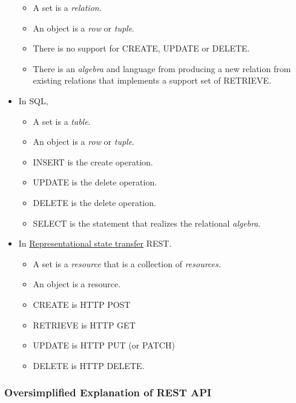 \documentclass[11pt]{article}
\providecommand{\tightlist}{%
      \setlength{\itemsep}{0pt}\setlength{\parskip}{0pt}}
\begin{document}
\begin{itemize}
  \begin{itemize}
  \tightlist
  \item
    A set is a \emph{relation}.
  \item
    An object is a \emph{row} or \emph{tuple}.
  \item
    There is no support for CREATE, UPDATE or DELETE.
  \item
    There is an \emph{algebra} and language from producing a new
    relation from existing relations that implements a support set of
    RETRIEVE.
  \end{itemize}
\item
  In SQL,

  \begin{itemize}
  \tightlist
  \item
    A set is a \emph{table}.
  \item
    An object is a \emph{row} or \emph{tuple}.
  \item
    INSERT is the create operation.
  \item
    UPDATE is the delete operation.
  \item
    DELETE is the delete operation.
  \item
    SELECT is the statement that realizes the relational \emph{algebra}.
  \end{itemize}
\item
  In
  \href{https://en.wikipedia.org/wiki/Representational_state_transfer}{Representational
  state transfer} REST.

  \begin{itemize}
  \tightlist
  \item
    A set is a \emph{resource} that is a collection of \emph{resources.}
  \item
    An object is a resource.
  \item
    CREATE is HTTP POST
  \item
    RETRIEVE is HTTP GET
  \item
    UPDATE is HTTP PUT (or PATCH)
  \item
    DELETE is HTTP DELETE.
  \end{itemize}
\end{itemize}

    \subsubsection{Oversimplified Explanation of REST
API}\label{oversimplified-explanation-of-rest-api}
\end{document}

